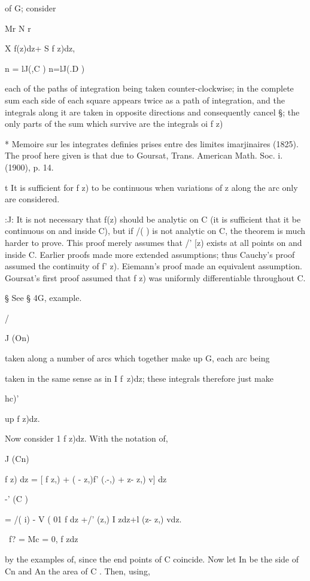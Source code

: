 of G; consider

Mr N r

X f(z)dz+ S f z)dz,

n = lJ(,C ) n=lJ(.D )

each of the paths of integration being taken counter-clockwise; in
the complete sum each side of each square appears twice as a path of
integration, and the integrals along it are taken in opposite
directions and consequently cancel §; the only parts of the sum which
survive are the integrals oi f z)

* Memoire sur les integrates definies prises entre des limites
imarjinaires (1825). The proof here given is that due to Goursat,
Trans. American Math. Soc. i. (1900), p. 14.

t It is sufficient for f z) to be continuous when variations of z
along the arc only are considered.

:J: It is not necessary that f(z) should be analytic on C (it is
sufficient that it be continuous on and inside C), but if /( ) is not
analytic on C, the theorem is much harder to prove. This proof merely
assumes that /' [z) exists at all points on and inside C. Earlier
proofs made more extended assumptions; thus Cauchy's proof assumed the
continuity of f' z). Eiemann's proof made an equivalent assumption.
Goursat's first proof assumed that f z) was uniformly differentiable
throughout C.

§ See § 4G, example.

/

J (On)

%
%

taken along a number of arcs which together make up G, each arc being

taken in the same sense as in I f\ z)dz; these integrals therefore
just make

hc)'

up f z)dz.

Now consider 1 f z)dz. With the notation of,

J (Cn)

f z) dz = [ f z,) + ( - z,)f' (.-,) + z- z,) v] dz

-' (C )

= /( i) - V ( 01 f dz +/' (z,) I zdz+l (z- z,) vdz.

\ f? = Mc = 0, f zdz

by the examples of, since the end points of C coincide. Now let
In be the side of Cn and An the area of C . Then, using,

